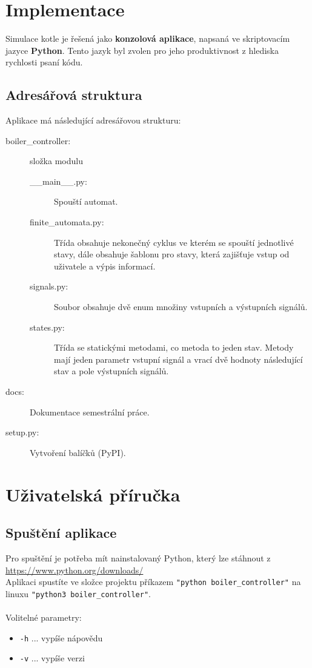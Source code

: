 \documentclass[12pt]{report}
\begin{document}
\chapter{Implementace}
Simulace kotle je řešená jako \textbf{konzolová aplikace}, napsaná ve skriptovacím jazyce \textbf{Python}. Tento jazyk byl zvolen pro jeho produktivnost z hlediska rychlosti psaní kódu.\\

\section{Adresářová struktura}
	Aplikace má následující adresářovou strukturu:\\
	\begin{description}
	\item [boiler\_controller:] složka modulu

	\begin{description}
		\item [\_\_main\_\_.py:] Spouští automat.
		\item [finite\_automata.py:] Třída obsahuje nekonečný cyklus ve kterém se spouští jednotlivé stavy, dále obsahuje šablonu pro stavy, která zajišťuje vstup od uživatele a výpis informací.
		\item [signals.py:] Soubor obsahuje dvě enum množiny vstupních a výstupních signálů.
		\item [states.py:] Třída se statickými metodami, co metoda to jeden stav. Metody mají jeden parametr vstupní signál a vrací dvě hodnoty následující stav a pole výstupních signálů.
		
	\end{description}	
	\item [docs:] Dokumentace semestrální práce.			
	\item [setup.py:] Vytvoření balíčků (PyPI).
	\end{description}

\chapter{Uživatelská příručka}
\section{Spuštění aplikace}
Pro spuštění je potřeba mít nainstalovaný Python, který lze stáhnout z \url{https://www.python.org/downloads/}\\
Aplikaci spustíte ve složce projektu příkazem \texttt{"python boiler\_controller"} na linuxu \texttt{"python3 boiler\_controller"}.\\
\\
Volitelné parametry:
\begin{itemize}
	\item \texttt{-h} ... vypíše nápovědu
	\item \texttt{-v} ... vypíše verzi
\end{itemize}
\end{document}
